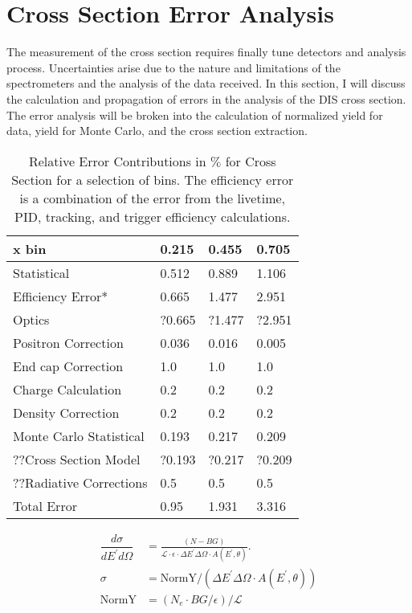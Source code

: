 \section{Cross Section Error Analysis}
The measurement of the cross section requires finally tune detectors and analysis process. Uncertainties arise due to the nature and limitations of the spectrometers and the analysis of the data received. In this section, I will discuss the calculation and propagation of errors in the analysis of the DIS cross section. The error analysis will be broken into the calculation of normalized yield for data, yield for Monte Carlo, and the cross section extraction. 
\begin{table}[]
	\caption{Relative Error Contributions in $\%$ for Cross Section for a selection of bins. The efficiency error is a combination of the error from the livetime, PID, tracking, and trigger efficiency calculations.}
	\centering
	\begin{tabular}{|l|l|l|l|}
		\hline
		\textbf{\qquad \qquad\qquad x bin}   & \textbf{0.215} & \textbf{0.455} & \textbf{0.705} \\ \hline\hline
		Statistical             & 0.512 & 0.889 & 1.106 \\ \hline
		Efficiency Error*       & 0.665 & 1.477 & 2.951 \\ \hline
		Optics 					& ?0.665& ?1.477 &?2.951 \\ \hline
		Positron Correction     & 0.036 & 0.016 & 0.005 \\ \hline
		End cap Correction     & 1.0 & 1.0 & 1.0 \\ \hline
		Charge Calculation     & 0.2 & 0.2 & 0.2 \\ \hline
		Density Correction      & 0.2 & 0.2 & 0.2 \\ \hline
		Monte Carlo Statistical & 0.193 & 0.217 & 0.209 \\ \hline
		??Cross Section Model 	& ?0.193 & ?0.217 & ?0.209 \\ \hline
		??Radiative Corrections\cite{primer} 	& 0.5  & 0.5 & 0.5 \\ \hline
		Total Error		 	 	& 0.95  & 1.931 & 3.316 \\ \hline
	\end{tabular}
\end{table}

\begin{align}
\dfrac{d\sigma}{dE^{\prime}d\Omega} &= \frac{(N - BG)}{\mathscr{L} \cdot \epsilon \cdot \Delta E^{\prime} \Delta \Omega \cdot A(E^{\prime},\theta)}. \nonumber\\
\sigma &= \text{NormY}/\left(\Delta E^{\prime} \Delta \Omega \cdot A(E^{\prime},\theta)\right)\nonumber\\
\text{NormY} &= \left(N_e \cdot BG/\epsilon \right) / \mathscr{L}
\end{align}
